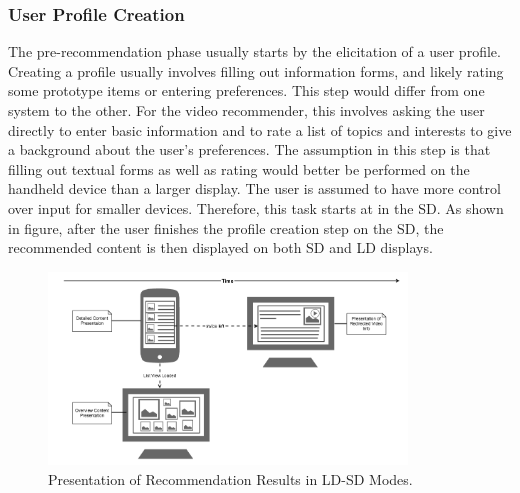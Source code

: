 \subsubsection{User Profile Creation}
The pre-recommendation phase usually starts by the elicitation of a user profile. Creating a profile usually involves filling out information forms, and likely rating some prototype items or entering preferences. This step would differ from one system to the other. For the video recommender, this involves asking the user directly to enter basic information and to rate a list of topics and interests to give a background about the user's preferences. 
The assumption in this step is that filling out textual forms as well as rating would better be performed on the handheld device than a larger display. The user is assumed to have more control over input for smaller devices. Therefore, this task starts at in the SD. As shown in figure, after the user finishes the profile creation step on the SD, the recommended content is then displayed on both SD and LD displays.
\begin{figure}[h!]
\includegraphics[width=0.85\textwidth, inner, center]{presentation-detail}
\caption{Presentation of Recommendation Results in LD-SD Modes.}
\label{fig:figure38}
\end{figure} 
